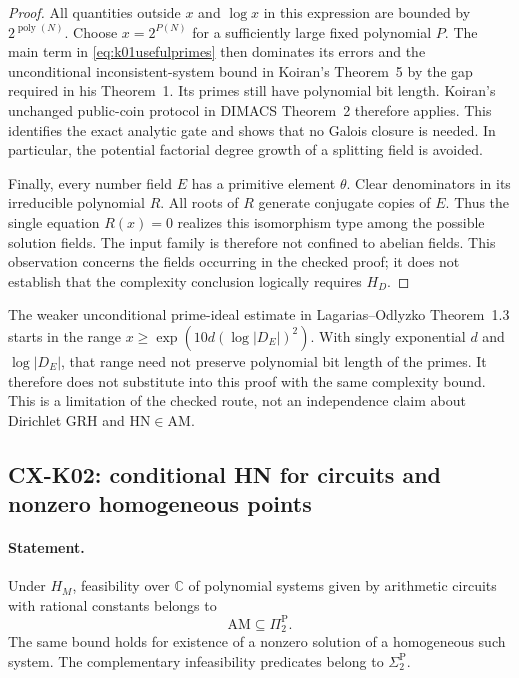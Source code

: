 \documentclass[11pt,a4paper]{article}
\begin{document}
\begin{proof}
All quantities outside $x$ and $\log x$ in this expression are bounded
by $2^{\operatorname{poly}(N)}$. Choose
$x=2^{P(N)}$ for a sufficiently large fixed polynomial $P$.
The main term in \eqref{eq:k01usefulprimes} then dominates its errors
and the unconditional inconsistent-system bound in Koiran's
Theorem~5 by the gap required in his Theorem~1. Its primes still have
polynomial bit length. Koiran's unchanged public-coin protocol in
DIMACS Theorem~2 therefore applies. This identifies the exact analytic
gate and shows that no Galois closure is needed. In particular, the
potential factorial degree growth of a splitting field is avoided.

Finally, every number field $E$ has a primitive element $\theta$.
Clear denominators in its irreducible polynomial $R$. All roots of
$R$ generate conjugate copies of $E$. Thus the single equation
$R(x)=0$ realizes this isomorphism type among the possible solution
fields. The input family is therefore not confined to abelian fields.
This observation concerns the fields occurring in the checked proof;
it does not establish that the complexity conclusion logically
requires $H_D$.
\end{proof}

The weaker unconditional prime-ideal estimate in
Lagarias--Odlyzko Theorem~1.3 starts in the range
$x\ge\exp(10d(\log|D_E|)^2)$. With singly exponential $d$ and
$\log|D_E|$, that range need not preserve polynomial bit length of
the primes. It therefore does not substitute into this proof with the
same complexity bound. This is a limitation of the checked route,
not an independence claim about Dirichlet GRH and $\mathrm{HN}\in
\mathrm{AM}$.

\subsection{CX-K02: conditional HN for circuits and nonzero homogeneous points}
\label{cx:k02}

\paragraph{Statement.}
Under $H_M$, feasibility over $\mathbb C$ of polynomial systems given
by arithmetic circuits with rational constants belongs to
\[
 \mathrm{AM}\subseteq\Pi_2^{\mathrm P}.
\]
The same bound holds for existence of a nonzero solution of a
homogeneous such system. The complementary infeasibility predicates
belong to $\Sigma_2^{\mathrm P}$.
\end{document}
